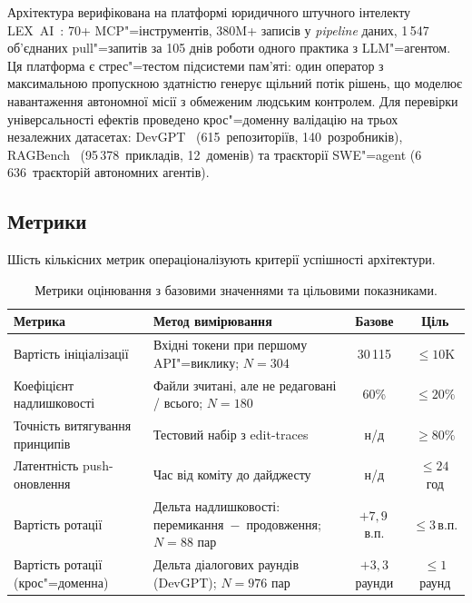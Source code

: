 \documentclass[11pt]{article}
\begin{document}
Архітектура верифікована на платформі юридичного штучного інтелекту LEX~AI~\citep{ovcharov2026edittrace}: 70+ MCP"=інструментів, 380M+ записів у \emph{pipeline} даних, 1\,547 об'єднаних pull"=запитів за 105 днів роботи одного практика з LLM"=агентом.
Ця платформа є стрес"=тестом підсистеми пам'яті: один оператор з максимальною пропускною здатністю генерує щільний потік рішень, що моделює навантаження автономної місії з обмеженим людським контролем.
Для перевірки універсальності ефектів проведено крос"=доменну валідацію на трьох незалежних датасетах: DevGPT~\citep{xiao2024devgpt} (615~репозиторіїв, 140~розробників), RAGBench~\citep{friel2024ragbench} (95\,378~прикладів, 12~доменів) та траєкторії SWE"=agent (6\,636~траєкторій автономних агентів).

\subsection{Метрики}
\label{sec:metrics}

Шість кількісних метрик операціоналізують критерії успішності архітектури.

\begin{table}[ht]
\centering
\small
\begin{tabularx}{\textwidth}{@{}l X c c@{}}
\toprule
\textbf{Метрика} & \textbf{Метод вимірювання} & \textbf{Базове} & \textbf{Ціль} \\
\midrule
Вартість ініціалізації &
  Вхідні токени при першому API"=виклику; $N{=}304$ &
  30\,115 & ${\leq}10$K \\
\addlinespace
Коефіцієнт надлишковості &
  Файли зчитані, але не редаговані / всього; $N{=}180$ &
  60\% & ${\leq}20\%$ \\
\addlinespace
Точність витягування принципів &
  Тестовий набір з edit-traces &
  н/д & ${\geq}80\%$ \\
\addlinespace
Латентність push-оновлення &
  Час від коміту до дайджесту &
  н/д & ${\leq}24$\,год \\
\addlinespace
Вартість ротації &
  Дельта надлишковості: перемикання~$-$~продовження; $N{=}88$ пар &
  $+7{,}9$\,в.п. & ${\leq}3$\,в.п. \\
\addlinespace
Вартість ротації (крос"=доменна) &
  Дельта діалогових раундів (DevGPT); $N{=}976$ пар &
  $+3{,}3$ раунди & ${\leq}1$ раунд \\
\bottomrule
\end{tabularx}
\caption{Метрики оцінювання з базовими значеннями та цільовими показниками.}
\label{tab:metrics}
\end{table}
\end{document}

